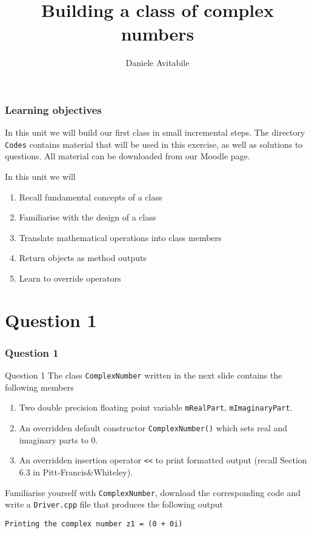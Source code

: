 \documentclass[8pt, compress]{beamer}
\title{Building a class of complex numbers}
\subtitle{}
\date{}
\author{Daniele Avitabile}
\institute{University of Nottingham}
\def\inline{\lstinline[basicstyle=\ttfamily,keywordstyle={},directivestyle={}]}
\begin{document}
\maketitle

\begin{frame}[fragile]
  \frametitle{Learning objectives}
  In this unit we will build our first class in small incremental steps. The
  directory \inline|Codes| contains material that will be used in this exercise,
  as well as solutions to questions. All material can be downloaded from our Moodle
  page.
  
  \begin{alertblock}{In this unit we will}

  \begin{enumerate}
    \item Recall fundamental concepts of a class
    \item Familiarise with the design of a class
    \item Translate mathematical operations into class members
    \item Return objects as method outputs
    \item Learn to override operators
  \end{enumerate}

  \end{alertblock}

\end{frame}

\section{Question 1}

\begin{frame}[fragile]
  \frametitle{Question 1}
  \begin{alertblock}{Question 1}
    The class \inline|ComplexNumber| written in the next slide contains the
    following members
  \begin{enumerate}
    \item Two double precision floating point variable \inline |mRealPart|,
      \inline|mImaginaryPart|.
    \item An overridden default constructor \inline|ComplexNumber()| which sets
      real and imaginary parts to $0$.
    \item An overridden insertion operator \inline|<<| to print formatted
      output (recall Section 6.3 in Pitt-Francis\&Whiteley).
  \end{enumerate}

    Familiarise yourself with \inline|ComplexNumber|, download the corresponding
    code and write a \inline|Driver.cpp| file that produces the following output
    \begin{lstlisting}[numbers=none]
Printing the complex number z1 = (0 + 0i)
    \end{lstlisting}
  \end{alertblock}
\end{frame}
\end{document}
